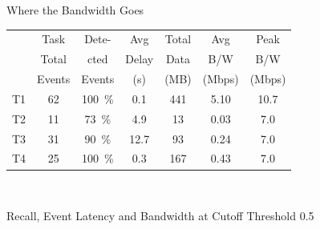 \begin{figure}
\caption{Where the Bandwidth Goes}
\label{fig:earlydiscard-frame-percent-breakdown}
\end{figure}

\begin{figure}
\hspace{-0.15in}
\begin{tabular}{|c|c|c|c|c|c|c|}
\hline
   &Task   &Dete-       &Avg&Total&Avg&Peak\\
   &Total&cted&Delay&Data&B/W&B/W\\
   &Events&Events&(s)&(MB)&(Mbps)&(Mbps)\\ 

\hline
T1 & \phantom{0}62  & 100~\%       &  \phantom{0}0.1&\phantom{0}441  &  5.10     &   10.7  \\
\hline
T2 & \phantom{0}11  & \phantom{0}73~\%      & \phantom{0}4.9 & \phantom{00}13            &  0.03 & \phantom{0}7.0 \\ %
\hline
T3 & \phantom{0}31  & \phantom{0}90~\%  & 12.7 & \phantom{00}93  &  0.24 &  \phantom{0}7.0 \\ %
\hline
T4 & \phantom{0}25  & 100~\%       & \phantom{0}0.3 & \phantom{0}167  &  0.43 &  \phantom{0}7.0 \\
\hline
\end{tabular}\\
\caption{Recall, Event Latency and Bandwidth at Cutoff Threshold 0.5}
\label{fig:early-discard-results}
\end{figure}

